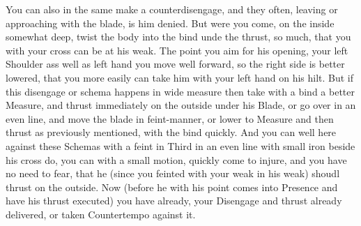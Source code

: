 You can also in the same make a counterdisengage, and they often,
leaving or approaching with the blade, is him denied. But were you
come, on the inside somewhat deep, twist the body into the bind unde
the thrust, so much, that you with your cross can be at his weak. The
point you aim for his opening, your left Shoulder ass well as left
hand you move well forward, so the right side is better lowered, that
you more easily can take him with your left hand on his hilt.
But if this disengage or schema happens in wide measure then take with
a bind a better Measure, and thrust immediately on the outside under
his Blade, or go over in an even line, and move the blade in
feint-manner, or lower to Measure and then thrust as previously
mentioned, with the bind quickly. And you can well here against these
Schemas with a feint in Third in an even line with small iron beside
his cross do, you can with a small motion, quickly come to
injure, and you have no need to fear, that he (since you feinted with
your weak in his weak) shoudl thrust on the outside. Now (before he
with his point comes into Presence and have his thrust executed) you
have already, your Disengage and thrust already delivered, or taken
Countertempo against it.
